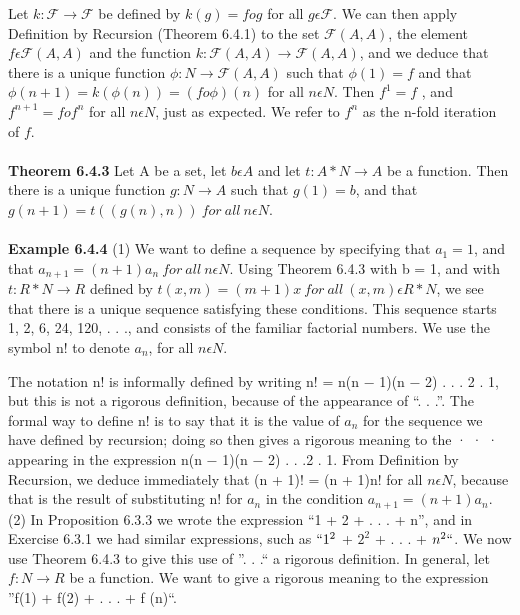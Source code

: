 \documentclass[a4paper,10pt]{report}
\begin{document}
Let $k:\mathscr{F}\rightarrow \mathscr{F}$ be defined by $k(g)=f o g$ for all $g\epsilon \mathscr{F}$. We can then apply Definition by Recursion (Theorem 6.4.1) to the set $\mathscr{F}(A,A)$, the element $f\epsilon \mathscr{F}(A,A)$ and the function $k:\mathscr{F}(A,A) \rightarrow \mathscr{F}(A,A)$, and we deduce that there is a unique function $\phi:N\rightarrow \mathscr{F}(A,A)$ such that $\phi(1)=f$ and that $\phi(n+1)=k(\phi(n))=(f o \phi)(n)$ for all $n\epsilon N$. Then $f^1 = f$ , and $f^{n+1} = f o f^n$ for all $n\epsilon N$, just as expected. We refer to $f^n$ as the n-fold iteration of $f$.
\\\\
{\bf Theorem 6.4.3} Let A be a set, let $b\epsilon A$ and let $t:A * N \rightarrow A$ be a function. Then there is a unique function $g:N \rightarrow A$ such that $g(1) = b$, and that $g(n + 1)=t((g(n), n))~ for~ all~ n \epsilon N$.
\\\\
{\bf Example 6.4.4} (1) We want to define a sequence by specifying that $a_1 = 1$, and that $a_{n+1}=(n + 1)a_n~ for~ all~ n\epsilon N.$ Using Theorem 6.4.3 with b = 1, and with $t:R*N\rightarrow R$ defined by $t(x, m) = (m + 1)x ~for~ all~ (x, m)\epsilon R*N$, we see that there is a unique sequence satisfying these conditions. This sequence starts 1, 2, 6, 24, 120, . . ., and consists of the familiar factorial numbers. We use the symbol n! to denote $a_n$, for all $n\epsilon N$. 

The notation n! is informally defined by writing n! = n(n − 1)(n − 2) . . . 2 . 1, but this is not a rigorous definition, because of the appearance of ``. . .''. The formal way to define n! is to say that it is the value of $a_n$ for the sequence we have defined by recursion; doing so then gives a rigorous meaning to the · · · appearing in the expression n(n − 1)(n − 2) . . .2 . 1. From Definition by Recursion, we deduce immediately that (n + 1)! = (n + 1)n! for all $n\epsilon N$, because that is the result of substituting n! for $a_n$ in the condition $a_{n+1}=(n + 1)a_n$.\\
(2) In Proposition 6.3.3 we wrote the expression ``1 + 2 + . . . + n'', and in Exercise 6.3.1 we had similar expressions, such as $``1^2$ + $2^2$ + . . . + $n^2``$. We now use Theorem 6.4.3 to give this use of ''. . .`` a rigorous definition. In general, let $f : N \rightarrow R$ be a function. We want to give a rigorous meaning to the expression ''f(1) + f(2) + . . . + f (n)``.
 
\end{document}
